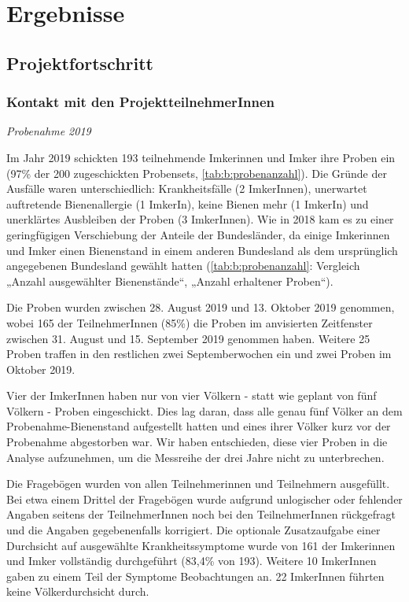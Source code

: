 \section{Ergebnisse}

\subsection{Projektfortschritt}
\subsubsection{Kontakt mit den ProjektteilnehmerInnen}

\textit{Probenahme 2019}

Im Jahr 2019 schickten 193 teilnehmende Imkerinnen und Imker ihre Proben ein (97\% der 200 zugeschickten Probensets, \cref{tab:b:probenanzahl}). Die Gründe der Ausfälle waren unterschiedlich: Krankheitsfälle (2 ImkerInnen), unerwartet auftretende Bienenallergie (1 ImkerIn), keine Bienen mehr (1 ImkerIn) und unerklärtes Ausbleiben der Proben (3 ImkerInnen). Wie in 2018 kam es zu einer geringfügigen Verschiebung der Anteile der Bundesländer, da einige Imkerinnen und Imker einen Bienenstand in einem anderen Bundesland als dem ursprünglich angegebenen Bundesland gewählt hatten (\cref{tab:b:probenanzahl}: Vergleich „Anzahl ausgewählter Bienenstände“, „Anzahl erhaltener Proben“).

Die Proben wurden zwischen 28. August 2019 und 13. Oktober 2019 genommen, wobei 165 der TeilnehmerInnen (85\%) die Proben im anvisierten Zeitfenster zwischen 31. August und 15. September 2019 genommen haben. Weitere 25 Proben traffen in den restlichen zwei Septemberwochen ein und zwei Proben im Oktober 2019.

Vier der ImkerInnen haben nur von vier Völkern - statt wie geplant von fünf Völkern - Proben eingeschickt. Dies lag daran, dass alle genau fünf Völker an dem Probenahme-Bienenstand aufgestellt hatten und eines ihrer Völker kurz vor der Probenahme abgestorben war. Wir haben entschieden, diese vier Proben in die Analyse aufzunehmen, um die Messreihe der drei Jahre nicht zu unterbrechen.

Die Fragebögen wurden von allen Teilnehmerinnen und Teilnehmern ausgefüllt. Bei etwa einem Drittel der Fragebögen wurde aufgrund unlogischer oder fehlender Angaben seitens der TeilnehmerInnen noch bei den TeilnehmerInnen rückgefragt und die Angaben gegebenenfalls korrigiert. Die optionale Zusatzaufgabe einer Durchsicht auf ausgewählte Krankheitssymptome wurde von 161 der Imkerinnen und Imker vollständig durchgeführt (83,4\% von 193). Weitere 10 ImkerInnen gaben zu einem Teil der Symptome Beobachtungen an. 22 ImkerInnen führten keine Völkerdurchsicht durch.

